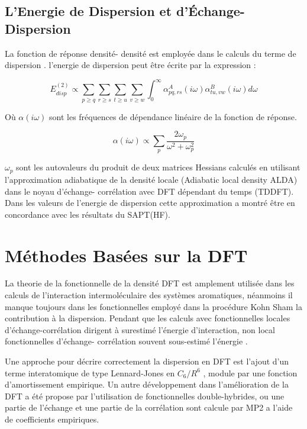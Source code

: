 \subsection{L'Energie de Dispersion et d'Échange- Dispersion}

La fonction de réponse densité- densité est employée dans le calculs du terme de dispersion \cite{hesselmann2003intermolecular}. l'energie de dispersion peut être écrite par la expression :

\begin{equation}
E_{disp}^{(2)} \propto \sum_{p\geq q} \sum_{r\geq s} \sum_{t\geq u} \sum_{v\geq w} \int_{0}^{\infty} \alpha_{pq,rs}^{A} (i\omega) \alpha_{tu,vw}^{B} (i\omega) d\omega
\end{equation}
 
 Où $\alpha(i\omega)$ sont les fréquences de dépendance linéaire de la fonction de réponse. 
 
 \begin{equation}
 \alpha(i\omega) \propto \sum_{p} \frac{2\omega_{p}}{\omega^{2} + \omega_{p}^{2}}  \label{ome}
 \end{equation}
 
 $\omega_{p}$ sont les autovaleurs du produit de deux matrices Hessians calculés en utilisant l'approximation adiabatique de la densité locale (Adiabatic local density ALDA)\cite{gross1996density} dans le noyau d'échange- corrélation avec DFT dépendant du temps (TDDFT). Dans les valeurs de l'energie de dispersion cette approximation a montré être en concordance avec les résultats du SAPT(HF). 
 
 \section{Méthodes Basées sur la DFT} 
 
 La theorie de la fonctionnelle de la densité DFT est amplement utilisée dans les calculs de l'interaction intermoléculaire des systèmes aromatiques, néanmoins il manque toujours dans les fonctionnelles employé dans la procédure Kohn Sham la contribution à la dispersion. Pendant que les calculs avec fonctionnelles locales d'échange-corrélation dirigent à surestimé l'énergie d'interaction, non local fonctionnelles d'échange- corrélation souvent sous-estimé l'énergie \cite{cohen2011challenges}.
 
 Une approche pour décrire correctement la dispersion en DFT est l’ajout d’un terme interatomique de type Lennard-Jones en $C_{6}/R^{6}$ , module par une fonction d’amortissement empirique. Un autre développement dans l’amélioration de la DFT a été propose par l’utilisation de fonctionnelles double-hybrides, ou une partie de l’échange et une partie de la corrélation sont calcule par MP2 a l’aide de coefficients empiriques.
 
